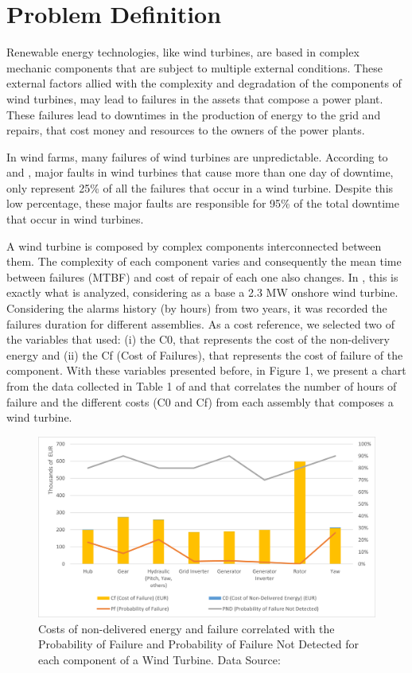 \section{Problem Definition} 
\label{sub:if_you_use_this_template} 

Renewable energy technologies, like wind turbines, are based in complex mechanic components that are subject to multiple external conditions. These external factors allied with the complexity and degradation of the components of wind turbines, may lead to failures in the assets that compose a power plant. These failures lead to downtimes in the production of energy to the grid and repairs, that cost money and resources to the owners of the power plants.

In wind farms, many failures of wind turbines are unpredictable. According to \cite{OLD_44_WIND} and \cite{OLD_18_WIND}, major faults in wind turbines that cause more than one day of downtime, only represent 25\% of all the failures that occur in a wind turbine. Despite this low percentage, these major faults are responsible for 95\% of the total downtime that occur in wind turbines.

A wind turbine is composed by complex components interconnected between them. The complexity of each component varies and consequently the mean time between failures (MTBF) and cost of repair of each one also changes. In \cite{OLD_55_WIND}, this is exactly what is analyzed, considering as a base a 2.3 MW onshore wind turbine. Considering the alarms history (by hours) from two years, it was recorded the failures duration for different assemblies. As a cost reference, we selected two of the variables that \cite{OLD_55_WIND} used: (i) the C0, that represents the cost of the non-delivery energy and (ii) the Cf (Cost of Failures), that represents the cost of failure of the component. With these variables presented before, in Figure 1, we present a chart from the data collected in Table 1 of \cite{OLD_55_WIND} and that correlates the number of hours of failure and the different costs (C0 and Cf) from each assembly that composes a wind turbine.

\begin{figure}[htbp]
	\centering
	\includegraphics[scale=0.8]{Chapters/Figures/introduction_fig1.png}
	\caption{Costs of non-delivered energy and failure correlated with the Probability of Failure and Probability of Failure Not Detected for each component of a Wind Turbine. Data Source: \cite{OLD_55_WIND}}
	\label{fig:Figuras_Tree_silhouettes-vectorial}
\end{figure}


